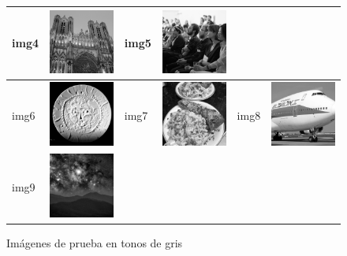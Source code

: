\documentclass{article}
\begin{document}
\begin{figure}[!htp]
\begin{center}
\begin{tabular}[t]{|ll|ll|ll|}
img4 & \includegraphics[width=3cm]{../imgs/input/imgs_gray/img04.png} &
img5 & \includegraphics[width=3cm]{../imgs/input/imgs_gray/img05.png} \\
\hline
img6 & \includegraphics[width=3cm]{../imgs/input/imgs_gray/img06.png} &
img7 & \includegraphics[width=3cm]{../imgs/input/imgs_gray/img07.png} &
img8 & \includegraphics[width=3cm]{../imgs/input/imgs_gray/img08.png} \\
\hline
img9 & \includegraphics[width=3cm]{../imgs/input/imgs_gray/img09.png} &&&& \\
\hline
\end{tabular}
\end{center}
\caption{Imágenes de prueba en tonos de gris}
\label{fig:imagenes_de_prueba_gris}
\end{figure}
\end{document}
